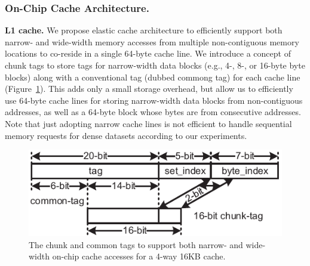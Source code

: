 

\subsubsection{On-Chip Cache Architecture.} 
\label{sec:memory:on-chip}
\noindent
\textbf{L1 cache.}
We propose elastic cache architecture to efficiently support both narrow- and wide-width memory accesses from multiple non-contiguous memory locations to co-reside in a single 64-byte cache line. 
We introduce a concept of chunk tags to store tags for narrow-width data blocks (e.g., 4-, 8-, or 16-byte byte blocks) along with a conventional tag (dubbed commong tag) for each cache line (Figure~\ref{fig:elastic-cache}). 
This adds only a small storage overhead, but allow us to efficiently use 64-byte cache lines for storing narrow-width data blocks from non-contiguous addresses, as well as a 64-byte block whose bytes are from consecutive addresses.
Note that just adopting narrow cache lines is not efficient to handle sequential memory requests for dense datasets according to our experiments.

\begin{figure}
\center
\includegraphics[width=1.0\linewidth]{./fig/chunk_tag_16bit-eps-converted-to.pdf}
\caption{The chunk and common tags to support both narrow- and wide-width on-chip cache accesses for a 4-way 16KB cache.}
\label{fig:elastic-cache}
\end{figure}

